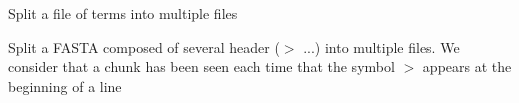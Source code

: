 \begin{description}
Split a file of terms into multiple files

Split a FASTA composed of several header ($>$ ...) into multiple files. We consider that a chunk
has been seen each time that the symbol $>$ appears at the beginning of a line
\end{description}

